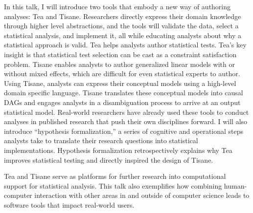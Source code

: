 In this talk, I will introduce two tools that embody a new way of authoring
analyses: Tea and Tisane. Researchers directly express their domain knowledge
through higher level abstractions, and the tools will validate the data, select
a statistical analysis, and implement it, all while educating analysts about why
a statistical approach is valid. Tea helps analysts author statistical tests.
Tea’s key insight is that statistical test selection can be cast as a constraint
satisfaction problem. Tisane enables analysts to author generalized linear
models with or without mixed effects, which are difficult for even statistical
experts to author. Using Tisane, analysts can express their conceptual models
using a high-level domain specific language. Tisane translates these conceptual
models into causal DAGs and engages analysts in a disambiguation process to
arrive at an output statistical model. Real-world researchers have already used
these tools to conduct analyses in published research that push their own
disciplines forward. I will also introduce “hypothesis formalization,” a series
of cognitive and operational steps analysts take to translate their research
questions into statistical implementations. Hypothesis formalization
retrospectively explains why Tea improves statistical testing and directly
inspired the design of Tisane. 

Tea and Tisane serve as platforms for further research into computational
support for statistical analysis. This talk also exemplifies how combining
human-computer interaction with other areas in and outside of computer science
leads to software tools that impact real-world users.
